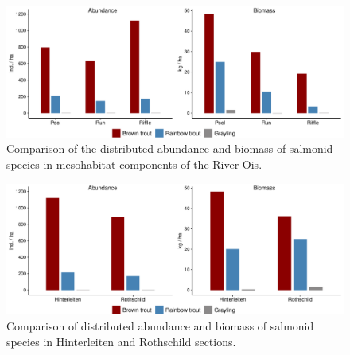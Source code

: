 
\begin{figure}[!htb]                              %
	\center
	\includegraphics[width=.9\textwidth]{images/mesohabitat.pdf}                %
	\caption{Comparison of the distributed abundance and biomass of salmonid species in mesohabitat components of the River Ois.}        %
	\label{fig:AB_meso}                                                       %
\end{figure}

\begin{figure}[!htb]                              %
	\center
	\includegraphics[width=.9\textwidth]{images/section.pdf}                %
	\caption{Comparison of distributed abundance and biomass of salmonid species in Hinterleiten and Rothschild sections.}        %
	\label{fig:AB_section}                                                       %
\end{figure}
